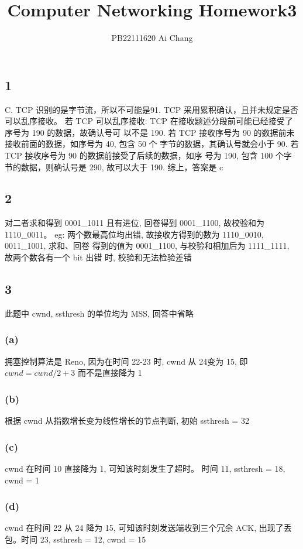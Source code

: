 \documentclass[UTF8]{ctexart}
\title{Computer Networking Homework3}
\author{PB22111620 Ai Chang}
\begin{document}
\begin{sloppypar}
\maketitle

\subsection*{1}

C. TCP 识别的是字节流，所以不可能是91. TCP 采用累积确认，且并未规定是否可以乱序接收。
若 TCP 可以乱序接收: TCP 在接收题述分段前可能已经接受了序号为 190 的数据，故确认号可
以不是 190. 若 TCP 接收序号为 90 的数据前未接收前面的数据，如序号为 40, 包含 50 个
字节的数据，其确认号就会小于 90. 若 TCP 接收序号为 90 的数据前接受了后续的数据，如序
号为 190, 包含 100 个字节的数据，则确认号是 290, 故可以大于 190. 综上，答案是 c

\subsection*{2}

对二者求和得到 0001\_1011 且有进位, 回卷得到 0001\_1100, 故校验和为 1110\_0011。
eg: 两个数最高位均出错, 故接收方得到的数为 1110\_0010, 0011\_1001, 求和、回卷
得到的值为 0001\_1100, 与校验和相加后为 1111\_1111, 故两个数各有一个 bit 出错
时, 校验和无法检验差错

\subsection*{3}
    此题中 cwnd, ssthresh 的单位均为 MSS, 回答中省略
    \subsubsection*{(a)}
        拥塞控制算法是 Reno, 因为在时间 22-23 时, cwnd 从 24变为 15,
        即 $cwnd= cwnd/2 + 3$ 而不是直接降为 1
    \subsubsection*{(b)}
        根据 cwnd 从指数增长变为线性增长的节点判断, 初始 ssthresh = 32
    \subsubsection*{(c)}
        cwnd 在时间 10 直接降为 1, 可知该时刻发生了超时。
        时间 11, ssthresh = 18, cwnd = 1
    \subsubsection*{(d)}
        cwnd 在时间 22 从 24 降为 15, 可知该时刻发送端收到三个冗余 ACK,
        出现了丢包。时间 23, ssthresh = 12, cwnd = 15

\end{sloppypar}
\end{document}
